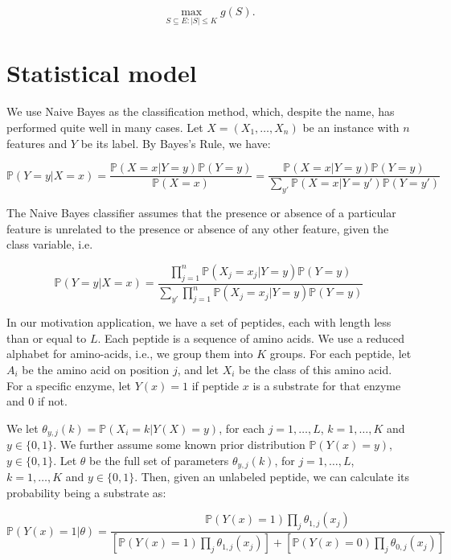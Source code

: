 \documentclass[opre,nonblindrev]{informs3} %
\newcommand{\Prob}{\mathbb{P}}
\begin{document}
\begin{equation}
  \max_{S \subseteq E: |S| \leq K} g(S). 
  \label{eq:opt}
\end{equation}

\section{Statistical model} \label{sec:stat model}
We use Naive Bayes as the classification method, which, despite the name, has performed quite well in many cases. Let $X=(X_1,\ldots,X_n)$ be an instance with $n$ features and $Y$ be its label. By Bayes's Rule, we have:

\begin{equation*}
\Prob(Y=y|X=x)=\frac{\Prob(X=x|Y=y)\Prob(Y=y)}{\Prob(X=x)}=\frac{\Prob(X=x|Y=y)\Prob(Y=y)}{\sum_{y'}\Prob(X=x|Y=y')\Prob(Y=y')}
\end{equation*}

The Naive Bayes classifier assumes that the presence or absence of a particular feature is unrelated to the presence or absence of any other feature, given the class variable, i.e.

\begin{equation*}
\Prob(Y=y|X=x) = \frac{\prod_{j=1}^n\Prob(X_j=x_j|Y=y)\Prob(Y=y)}{\sum_{y'}\prod_{j=1}^n\Prob(X_j=x_j|Y=y)\Prob(Y=y)}
\end{equation*}

In our motivation application, we have a set of peptides, each with length less than or equal to $L$. Each peptide is a sequence of amino acids. We use a reduced alphabet for amino-acids, i.e., we group them into $K$ groups. For each peptide, let $A_i$ be the amino acid on position $j$, and let $X_i$ be the class of this amino acid. For a specific enzyme, let $Y(x)=1$ if peptide $x$ is a substrate for that enzyme and 0 if not.

We let $\theta_{y,j}(k)=\Prob(X_i=k|Y(X)=y)$, for each $j=1,\ldots,L$, $k=1,\ldots,K$ and $y\in\{0,1\}$. We further assume some known prior distribution $\Prob(Y(x)=y)$, $y\in\{0,1\}$. Let $\theta$ be the full set of parameters $\theta_{y,j}(k)$, for $j=1,\ldots,L$, $k=1,\ldots,K$ and $y\in\{0,1\}$. Then, given an unlabeled peptide, we can calculate its probability being a substrate as:

\begin{equation} \label{eq:model}
  \Prob\left(Y(x) = 1 | \theta\right) =
  \frac{\Prob(Y(x)=1) \prod_{j} \theta_{1,j}(x_j)}{
  \left[ \Prob(Y(x)=1) \prod_{j} \theta_{1,j}(x_j)\right] +
  \left[ \Prob(Y(x)=0) \prod_{j} \theta_{0,j}(x_j)\right]}
\end{equation}
\end{document}
